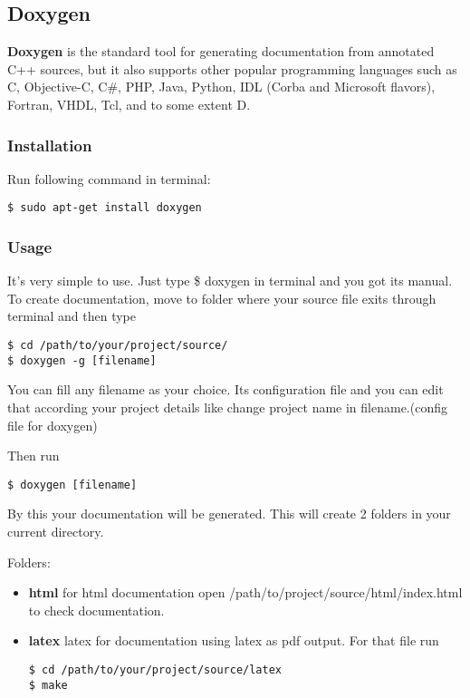 \newpage

\subsection{Doxygen}

{\bf Doxygen} is the standard tool for generating documentation from
annotated C++ sources, but it also supports other popular programming
languages such as C, Objective-C, C\#, PHP, Java, Python, IDL (Corba
and Microsoft flavors), Fortran, VHDL, Tcl, and to some extent D.

\subsubsection{Installation}
Run following command in terminal:
\begin{verbatim}
$ sudo apt-get install doxygen
\end{verbatim}

\subsubsection{Usage}
It’s very simple to use. Just type \$ doxygen in terminal and you got
its manual.\\
To create documentation, move to folder where your source file exits
through terminal and then type
\begin{verbatim}
$ cd /path/to/your/project/source/
$ doxygen -g [filename]
\end{verbatim}

You can fill any filename as your choice. Its configuration file and
you can edit that according your project details like change project
name in filename.(config file for doxygen)

Then run

\begin{verbatim}
$ doxygen [filename]
\end{verbatim}

By this your documentation will be generated. This will create 2
folders in your current directory.

Folders: 

\begin{itemize}
\item {\bf html} for html documentation open
/path/to/project/source/html/index.html to check documentation.
\item {\bf latex} latex for documentation using latex as pdf output.
For that file run
\begin{verbatim}
$ cd /path/to/your/project/source/latex
$ make
\end{verbatim}
\end{itemize}


